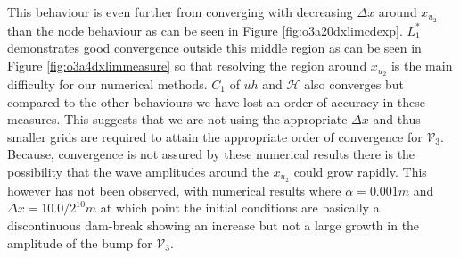 \documentclass[SingleSpace,12pt,Proceedings]{Serre_ASCE}
\begin{document}
This behaviour is even further from converging with decreasing $\Delta x$ around $x_{u_2}$ than the node behaviour as can be seen in Figure \ref{fig:o3a20dxlimcdexp}. $L^*_1$ demonstrates good convergence outside this middle region as can be seen in Figure \ref{fig:o3a4dxlimmeasure} so that resolving the region around $x_{u_2}$ is the main difficulty for our numerical methods. $C_1$ of $uh$ and $\mathcal{H}$ also converges but compared to the other behaviours we have lost an order of accuracy in these measures. This suggests that we are not using the appropriate $\Delta x$ and thus smaller grids are required to attain the appropriate order of convergence for $\mathcal{V}_3$. Because, convergence is not assured by these numerical results there is the possibility that the wave amplitudes around the $x_{u_2}$ could grow rapidly. This however has not been observed, with numerical results where $\alpha = 0.001m$ and $\Delta x = 10.0/ 2^{10}m$ at which point the initial conditions are basically a discontinuous dam-break showing an increase but not a large growth in the amplitude of the bump for $\mathcal{V}_3$.
\end{document}
